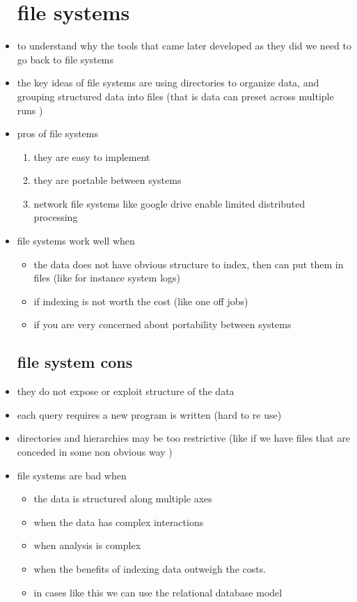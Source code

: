 \documentclass{article}
\begin{document}
\begin{itemize}
\section*{file systems}
\item to understand why the tools that came later developed as they did we need to go back to file systems 
\item the key ideas of file systems are using directories to organize data, and grouping structured data into files (that is data can preset across multiple runs ) 
\item  pros of file systems 
\begin{enumerate}
    \item they are easy to implement 
    \item they are portable between systems 
    \item network file systems like google drive enable limited distributed processing 
\end{enumerate}
\item file systems work well when
\begin{itemize}
    \item the data does not have obvious structure to index, then can put them in files (like for instance system logs)
    \item if indexing is not worth the cost (like one off jobs)
    \item if you are very concerned about portability between systems 
\end{itemize}
\subsection*{file system cons}
\item they do not expose or exploit structure of the data
\item each query requires a new program is written (hard to re use)
\item directories and hierarchies may be too restrictive (like if we have files that are conceded in some non obvious way )
\item file systems are bad when 
\begin{itemize}
    \item the data is structured along multiple axes 
    \item when the data has complex interactions 
    \item when analysis is complex
    \item when the benefits of indexing data outweigh the costs. 
    \item in cases like this we can use the relational database model

\end{itemize}
\end{itemize}
\end{document}
